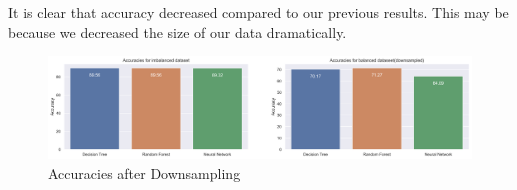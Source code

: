 It is clear that accuracy decreased compared to our previous results. This may be because we decreased the size of our data dramatically.
\begin{figure}[!ht]
 \centering
\includegraphics[width=6.1in]{assignment2/1-7-barcharts_dn.png}
\caption{\label{fig:fig5}Accuracies after Downsampling }
\end{figure}



